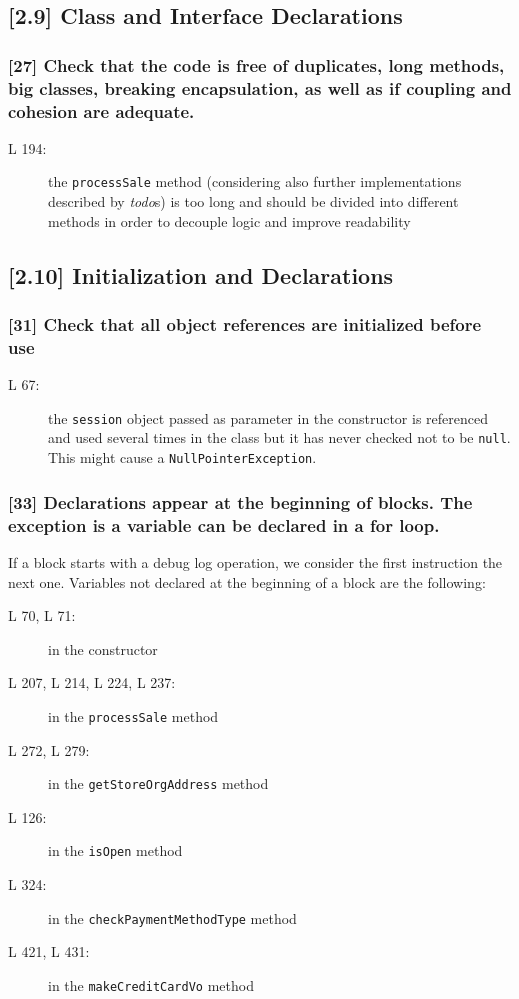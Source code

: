 \subsection*{[2.9] Class and Interface Declarations}
\subsubsection*{[27] Check that the code is free of duplicates, long methods, big classes, breaking encapsulation, as well as if coupling and cohesion are adequate.}
\begin{description}
	\item[L 194:] the {\tt processSale} method (considering also further implementations described by \emph{todo}s) is too long and should be divided into different methods in order to decouple logic and improve readability
\end{description}

\subsection*{[2.10] Initialization and Declarations}
\subsubsection*{[31] Check that all object references are initialized before use}
\begin{description}
	\item[L 67:] the {\tt session} object passed as parameter in the constructor is referenced and used several times in the class but it has never checked not to be {\tt null}. This might cause a {\tt NullPointerException}.
\end{description} 

\subsubsection*{[33] Declarations appear at the beginning of blocks. The exception is a variable can be declared in a for loop.}
If a block starts with a debug log operation, we consider the first instruction the next one. Variables not declared at the beginning of a block are the following:
\begin{description}
	\item[L 70, L 71:] in the constructor 
	\item[L 207, L 214, L 224, L 237:] in the {\tt processSale} method 
	\item[L 272, L 279:] in the {\tt getStoreOrgAddress} method 
	\item[L 126:] in the {\tt isOpen} method 
	\item[L 324:] in the {\tt checkPaymentMethodType} method  
	\item[L 421, L 431:] in the {\tt makeCreditCardVo} method 
\end{description}

